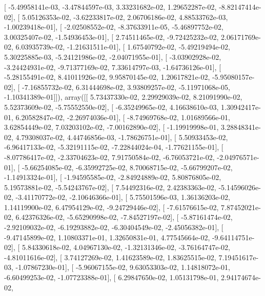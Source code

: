 \documentclass{article}
\begin{document}
       [ -5.49958141e-03,  -3.47844597e-03,   3.33231682e-02,
          1.29652287e-02,  -8.82147414e-02],
       [  5.05126353e-02,  -3.62233817e-02,   2.06706186e-02,
          4.88533762e-03,  -1.00239418e-01],
       [ -2.02508552e-02,  -8.37633911e-05,  -5.46897752e-02,
          3.00325407e-02,  -1.54936453e-01],
       [  2.74511465e-02,  -9.72425232e-02,   2.06171769e-02,
          6.03935739e-02,  -1.21631511e-01],
       [  1.67540792e-02,  -5.49219494e-02,   5.30225885e-03,
         -5.24121986e-02,  -2.04071955e-01],
       [ -3.03902928e-02,  -3.24424931e-02,  -9.71377169e-02,
          7.33614797e-03,  -1.64736126e-01],
       [ -5.28155491e-02,   8.41011926e-02,   9.95870145e-02,
          1.20617821e-02,  -5.95080157e-02],
       [ -7.16855732e-02,   6.31444698e-02,   3.93809257e-02,
         -5.11971068e-05,  -1.10341389e-01]]), array([[  5.73437330e-02,   2.29929039e-02,   8.21091990e-02,
          5.52373609e-02,  -5.75552550e-02],
       [ -6.35249965e-02,   4.16638610e-03,   1.30942417e-01,
          6.20582847e-02,  -2.26974036e-01],
       [ -8.74969768e-02,   1.01689566e-01,   3.62854449e-02,
          7.03203102e-02,  -7.00162890e-02],
       [ -1.19919998e-01,   3.28848341e-02,   4.79308037e-02,
          4.44746856e-03,  -1.78626751e-01],
       [  5.50933453e-02,  -6.96417133e-02,  -5.32191115e-02,
         -7.22844024e-04,  -1.77621155e-01],
       [ -8.07786417e-02,  -2.33704623e-02,   7.91750584e-02,
         -6.76053721e-02,  -2.04976571e-01],
       [ -5.66254085e-02,  -6.35992725e-02,   8.70068715e-02,
         -5.66799207e-02,  -1.14913324e-01],
       [ -1.94595585e-02,  -2.84924889e-02,   5.80876805e-02,
          5.19573881e-02,  -5.54243767e-02],
       [  7.54492316e-02,   2.42383363e-02,  -5.14596026e-02,
         -3.41170772e-02,  -2.10646366e-01],
       [  5.75501596e-03,   1.36136203e-02,   1.14119900e-02,
          6.47954129e-02,  -9.24729446e-02],
       [ -7.61576615e-02,   7.87452021e-02,   6.42376326e-02,
         -5.65290998e-02,  -7.84527197e-02],
       [ -5.87161474e-02,  -2.92109032e-02,  -6.19293882e-02,
         -6.30404549e-02,  -2.45056382e-01],
       [ -9.47145899e-02,   1.10803371e-01,   1.32650831e-01,
          4.77545664e-02,  -9.64114751e-02],
       [  5.84330618e-02,   4.04967130e-02,  -1.32131346e-02,
         -3.76164747e-02,  -4.81011616e-02],
       [  3.74127269e-02,   1.41623589e-02,   1.83625515e-02,
          7.19451617e-03,  -1.07867230e-01],
       [ -5.96067155e-02,   9.63053303e-02,   1.14818072e-01,
         -6.60499253e-02,  -1.07723388e-01],
       [  6.29847650e-02,   1.05131798e-01,   2.94174674e-02,
\end{document}
